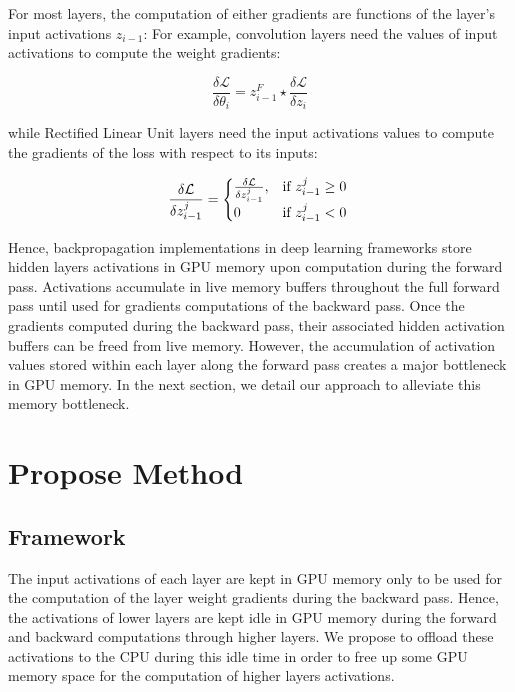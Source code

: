 \documentclass[11pt,onecolumn]{article}
\begin{document}
For most layers, the computation of either gradients are functions of the layer's input activations $z_{i-1}$:
For example, convolution layers need the values of input activations to compute the weight gradients:

\begin{equation}
\frac{\delta \mathcal{L}}{\delta \theta_i} = z_{i-1}^F \star \frac{\delta \mathcal{L}}{\delta z_i} 
\end{equation}

while Rectified Linear Unit layers need the input activations values 
to compute the gradients of the loss with respect to its inputs:

\begin{equation}
\frac{\delta \mathcal{L}}{\delta z_{i-1}^j}  = \begin{cases}
\frac{\delta \mathcal{L}}{\delta z_{i-1}^j}, & \text{if}\ z_{i-1}^j \geq 0 \\
0 & \text{if}\ z_{i-1}^j < 0
\end{cases} \\
\end{equation}

Hence, backpropagation implementations in deep learning frameworks
store hidden layers activations in GPU memory 
upon computation during the forward pass. 
Activations accumulate in live memory buffers throughout the full forward pass
until used for gradients computations of the backward pass. 
Once the gradients computed during the backward pass, 
their associated hidden activation buffers can be freed from live memory. 
However, the accumulation of activation values stored within each layer 
along the forward pass creates a major bottleneck in GPU memory.
In the next section, we detail our approach to alleviate this memory bottleneck.

\section{Propose Method}
\subsection{Framework}

The input activations of each layer are kept in GPU memory only to be used for the
computation of the layer weight gradients during the backward pass. 
Hence, the activations of lower layers are kept idle in GPU memory during the
forward and backward computations through higher layers.
We propose to offload these activations to the CPU during this idle time
in order to free up some GPU memory space for the computation of higher layers activations.
\end{document}
